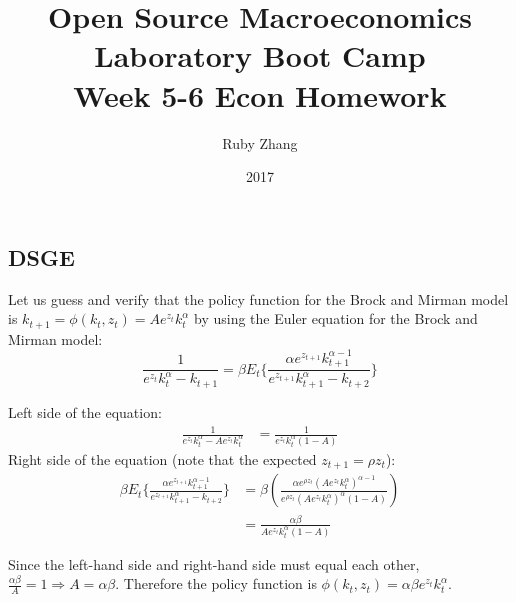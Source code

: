 \documentclass[letterpaper,11pt]{article}
\theoremstyle{definition}
\begin{document}
\begin{titlepage}
	\title{Open Source Macroeconomics Laboratory Boot Camp \\ Week 5-6 Econ Homework}
	\author{Ruby Zhang}
	\date{\LARGE{2017}}
	\maketitle
\end{titlepage}

\begin{spacing}{1.5}


\section*{DSGE}\label{DSGE_HW}

	\begin{Exercise} \label{DSGE_HW_BM_FindA}
		Let us guess and verify that the policy function for the Brock and Mirman model is $k_{t+1}=\phi(k_t, z_t) = Ae^{z_t}k_t^{\alpha}$ by using the Euler equation for the Brock and Mirman model:
		\begin{equation*}
			\frac{1}{e^{z_t}k_t^\alpha-k_{t+1}} = \beta E_t\{\frac{\alpha e^{z_{t+1}} k_{t+1}^{\alpha-1}}{e^{z_{t+1}}k_{t+1}^\alpha-k_{t+2}}\}
		\end{equation*}

		Left side of the equation:
		\begin{align*}
			\frac{1}{e^{z_t}k_t^\alpha-Ae^{z_t}k_t^{\alpha}} &= \frac{1}{e^{z_t}k_t^{\alpha}(1-A)}
		\end{align*}
		Right side of the equation (note that the expected $z_{t+1} = \rho z_t$):
		\begin{align*}
			\beta E_t\{\frac{\alpha e^{z_{t+1}} k_{t+1}^{\alpha-1}}{e^{z_{t+1}}k_{t+1}^\alpha-k_{t+2}}\} &= \beta(\frac{\alpha e^{\rho z_t}(Ae^{z_t}k_t^\alpha)^{\alpha-1}}{e^{\rho z_t}(Ae^{z_t}k_t^\alpha)^{\alpha}(1-A)}) \\
			&= \frac{\alpha\beta}{Ae^{z_t}k_t^\alpha(1-A)}
		\end{align*}

		Since the left-hand side and right-hand side must equal each other, $\frac{\alpha\beta}{A} = 1 \Longrightarrow A = \alpha\beta$. Therefore the policy function is $\phi(k_t,z_t) = \alpha\beta e^{z_t}k_t^\alpha$.
	\end{Exercise}


\end{spacing}
\end{document}
